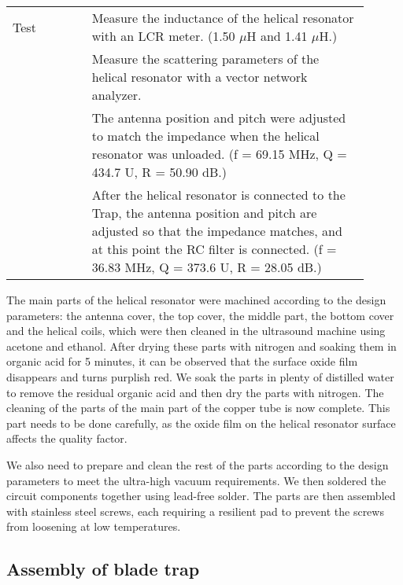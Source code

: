 \begin{table}
\begin{tabular}{p{0.2\linewidth}p{0.7\linewidth}}
        Test         & Measure the inductance of the helical resonator with an LCR meter. (1.50 $\mu$H and 1.41 $\mu $H.)                                                                                                                         \\
                     & Measure the scattering parameters of the helical resonator with a vector network analyzer.                                                                                                                                 \\
                     & The antenna position and pitch were adjusted to match the impedance when the helical resonator was unloaded. (f = 69.15 MHz, Q = 434.7 U, R = 50.90 dB.)                                                                   \\
                     & After the helical resonator is connected to the Trap, the antenna position and pitch are adjusted so that the impedance matches, and at this point the RC filter is connected. (f = 36.83 MHz, Q = 373.6 U, R = 28.05 dB.) \\
        \bottomrule
    \end{tabular}
\end{table}

The main parts of the helical resonator were machined according to the design parameters: the antenna cover, the top cover, the middle part, the bottom cover and the helical coils, which were then cleaned in the ultrasound machine using acetone and ethanol. After drying these parts with nitrogen and soaking them in organic acid for 5 minutes, it can be observed that the surface oxide film disappears and turns purplish red. We soak the parts in plenty of distilled water to remove the residual organic acid and then dry the parts with nitrogen. The cleaning of the parts of the main part of the copper tube is now complete. This part needs to be done carefully, as the oxide film on the helical resonator surface affects the quality factor.

We also need to prepare and clean the rest of the parts according to the design parameters to meet the ultra-high vacuum requirements. We then soldered the circuit components together using lead-free solder. The parts are then assembled with stainless steel screws, each requiring a resilient pad to prevent the screws from loosening at low temperatures.


\subsection{Assembly of blade trap}

